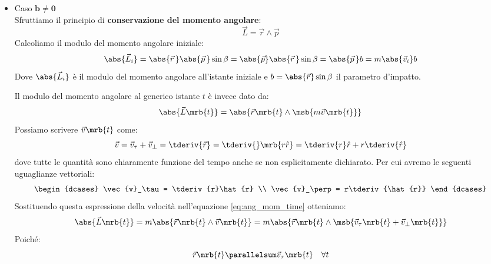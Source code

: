 \begin{itemize}
  \item Caso $\boxed{\boldsymbol{b \neq 0}}$\\
    Sfruttiamo il principio di \textbf{conservazione del momento angolare}:
    \begin{equation}
      \vec{L} = \vec{r} \wedge \vec{p}
    \end{equation}
    Calcoliamo il modulo del momento angolare iniziale:
    \begin{equation}
      \abs{\vec{L}_i} = \abs{\vec{r}\,} \abs{\vec{p}\,} \sin{\beta} =
      \abs{\vec{p}} \abs{\vec{r}\,} \sin{\beta} = \abs{\vec{p}\,} b =
      m\abs{\vec{v}_i}b
      \label{eq:mod_mom_ang_iniziale}
    \end{equation}
    Dove $\abs{\vec{L}_i}$ è il modulo del momento angolare all'istante
    iniziale e $b = \abs{\vec{r}}\sin{\beta}$ il parametro d'impatto.\par
    Il modulo del momento angolare al generico istante $t$ è invece dato da:
    \begin{equation}
      \abs{\vec{L}\mrb{t}} =
      \abs{\vec{r}\mrb{t}\wedge\msb{m\vec{v}\mrb{t}}}
      \label{eq:ang_mom_time}
    \end{equation}
    Possiamo scrivere $\vec{v}\mrb{t}$ come:
    \begin{equation}
      \vec{v} = \vec{v}_\tau + \vec{v}_\perp = \tderiv{\vec{r}} =
      \tderiv{}\mrb{r\hat{r}} = \tderiv{r}\hat{r} + r\tderiv{\hat{r}}
    \end{equation}
    dove tutte le quantità sono chiaramente funzione del tempo anche se non
    esplicitamente dichiarato.
    Per cui avremo le seguenti uguaglianze vettoriali:
    \begin{equation}
      \begin{dcases}
        \vec{v}_\tau = \tderiv{r}\hat{r} \\
        \vec{v}_\perp = r\tderiv{\hat{r}}
      \end{dcases}
      \label{eq:vel_equations}
    \end{equation}
    Sostituendo questa espressione della velocità nell'equazione
    \ref{eq:ang_mom_time} otteniamo:
    \begin{equation}
      \abs{\vec{L}\mrb{t}} = m
      \abs{\vec{r}\mrb{t}\wedge\vec{v}\mrb{t}} =
      m \abs{\vec{r}\mrb{t}\wedge\msb{\vec{v}_\tau \mrb{t} +
      \vec{v}_\perp \mrb{t}}}
      \label{eq:ang_mom_time*}
    \end{equation}
    Poiché:
    \begin{equation}
      \vec{r}\mrb{t} \parallelsum \vec{v}_\tau\mrb{t} \quad \forall t

\end{equation}
\end{itemize}
